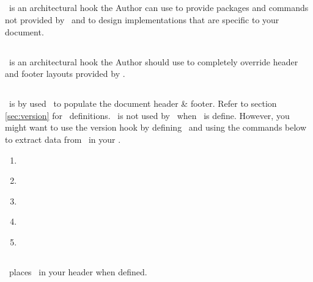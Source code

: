 \documentclass[12pt]{tlc-article}
\begin{document}

\subsection{\tlcAL}
\tlcAL\ is an architectural hook the Author can use to provide packages and
commands not provided by \tlcA\, and to design implementations that are specific
to your document.

\tlcVspace

%



\subsection{\tlcHF}
\tlcHF\ is an architectural hook the Author should use to completely override
header and footer layouts provided by \tlcA.


\subsection{\tlcVE}
\tlcVE\ is by used \tlcA\ to populate the document header \& footer.  Refer to
section \ref{sec:version} for \tlcVE\ definitions. \tlcVE\ is not
used by \tlcA\ when \tlcHF\ is define.  However, you might want to use the
version hook by defining \tlcVE\ and using the commands below to extract data
from \tlcVE\ in your \tlcHF.
\begin{enumerate}
  \item \tlcVC\
  \item \tlcDC\
  \item \tlcSC\
  \item \tlcIC\
  \item \tlcPC\
\end{enumerate}


\subsection{\tlcLG}
\tlcA\ places \tlcLG\ in your header when defined.
\end{document}

